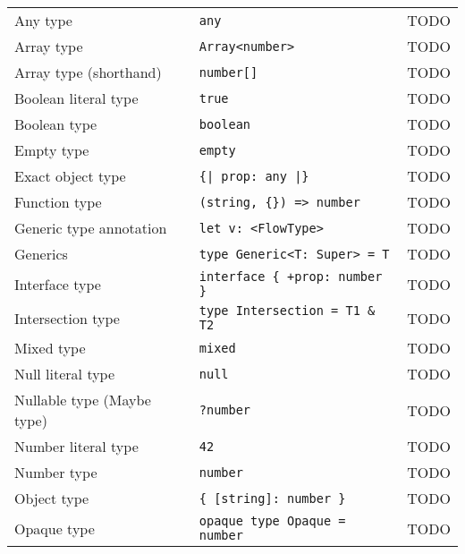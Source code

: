 \begin{footnotesize}
\begin{longtabu} to 
  \midrule
   &  &  \\
  \midrule
  \endhead
  Any type                   & \texttt{any}                             & TODO \\
  Array type                 & \texttt{Array<{}number>{}}               & TODO \\
  Array type (shorthand)     & \texttt{number[]}                        & TODO \\
  Boolean literal type       & \texttt{true}                            & TODO \\
  Boolean type               & \texttt{boolean}                         & TODO \\
  Empty type                 & \texttt{empty}                           & TODO \\
  Exact object type          & \texttt{\{| prop: any |\}}               & TODO \\
  Function type              & \texttt{(string, \{\}) => number}        & TODO \\
  Generic type annotation    & \texttt{let v: <{}FlowType>{}}           & TODO \\
  Generics                   & \texttt{type Generic<{}T: Super> = T}    & TODO \\
  Interface type             & \texttt{interface \{ +prop: number \}}   & TODO \\
  Intersection type          & \texttt{type Intersection = T1 \& T2}    & TODO \\
  Mixed type                 & \texttt{mixed}                           & TODO \\
  Null literal type          & \texttt{null}                            & TODO \\
  Nullable type (Maybe type) & \texttt{?number}                         & TODO \\
  Number literal type        & \texttt{42}                              & TODO \\
  Number type                & \texttt{number}                          & TODO \\
  Object type                & \texttt{\{ {[}string{]}: number \}}      & TODO \\
  Opaque type                & \texttt{opaque type Opaque = number}     & TODO \\

\end{longtabu}
\end{footnotesize}
